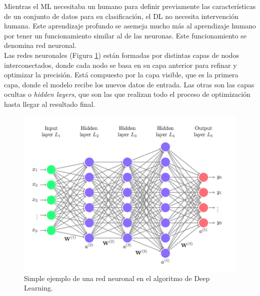 Mientras el ML necesitaba un humano para definir previamente las características de un conjunto de datos para su clasificación, el DL no necesita intervención humana. Este aprendizaje profundo se asemeja mucho más al aprendizaje humano por tener un funcionamiento similar al de las neuronas. Este funcionamiento se denomina red neuronal.\\

Las redes neuronales (Figura \ref{fig:red}) están formadas por distintas capas de nodos interconectados, donde cada nodo se basa en su capa anterior para refinar y optimizar la precisión. Está compuesto por la capa visible, que es la primera capa, donde el modelo recibe los nuevos datos de entrada. Las otras son las capas ocultas o \textit{hidden layers}, que son las que realizan todo el proceso de optimización hasta llegar al resultado final.\\
\begin{figure} [h!]
  \begin{center}
    \includegraphics[width=12cm]{figs/deep_learning}
  \end{center}
  \caption{Simple ejemplo de una red neuronal en el algoritmo de Deep Learning.}
  \label{fig:red}
\end{figure}

